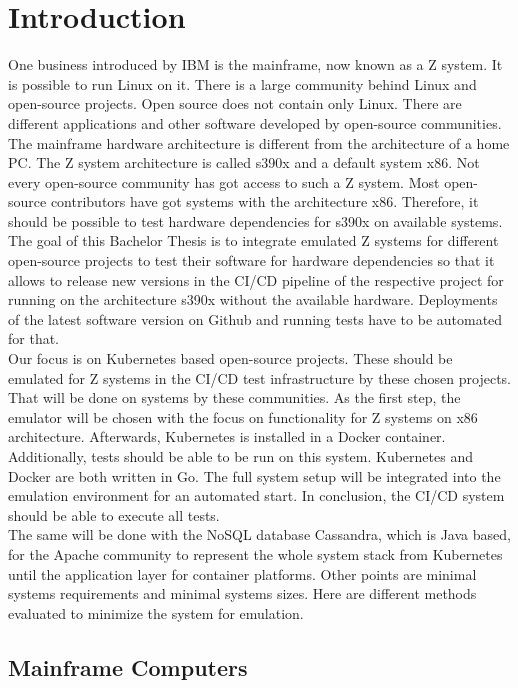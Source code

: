 \chapter{Introduction}\label{ch:intro}

One business introduced by IBM is the mainframe, now known as a Z system. It is possible to run Linux on it. There is a large community behind Linux and open-source projects. Open source does not contain only \gls{Linux}. There are different applications and other software developed by open-source communities. The mainframe hardware architecture is different from the architecture of a home PC. The Z system architecture is called \gls{s390x} and a default system \gls{x86}. Not every open-source community has got access to such a Z system. Most open-source contributors have got systems with the architecture x86. Therefore, it should be possible to test hardware dependencies for s390x on available systems. The goal of this Bachelor Thesis is to integrate emulated Z systems for different open-source projects to test their software for hardware dependencies so that it allows to release new versions in the CI/CD pipeline of the respective project for running on the architecture s390x without the available hardware. Deployments of the latest software version on Github and running tests have to be automated for that.\\
Our focus is on Kubernetes based open-source projects. These should be emulated for Z systems in the \gls{CI/CD} test infrastructure by these chosen projects. That will be done on systems by these communities. As the first step, the emulator will be chosen with the focus on functionality for Z systems on x86 architecture. Afterwards, Kubernetes is installed in a Docker container. Additionally, tests should be able to be run on this system. Kubernetes and Docker are both written in Go. The full system setup will be integrated into the emulation environment for an automated start. In conclusion, the CI/CD system should be able to execute all tests. \\
The same will be done with the NoSQL database Cassandra, which is Java based, for the Apache community to represent the whole system stack from Kubernetes until the \gls{application layer} for container platforms. Other points are minimal systems requirements and minimal systems sizes. Here are different methods evaluated to minimize the system for emulation.


\section{Mainframe Computers}

